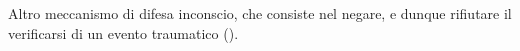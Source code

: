 \documentclass{subfiles}
\begin{document}
Altro meccanismo di difesa inconscio, che consiste nel negare, e dunque rifiutare il verificarsi di un evento traumatico
().
\end{document}
